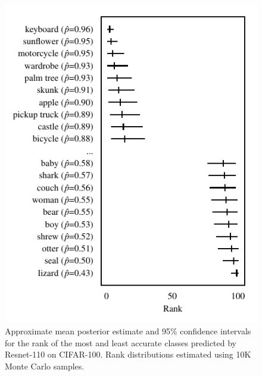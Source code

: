 \documentclass{article}
\begin{document}
\begin{figure}[t]
    \centering
    \includegraphics{figures/cifar100_rank.pdf}
    \caption{
        Approximate mean posterior estimate and 95\% confidence intervals for the rank of the most and least accurate classes predicted by Resnet-110 on CIFAR-100.
        Rank distributions estimated using 10K Monte Carlo samples.
    }
    \label{fig:cifar100_rank}
\end{figure}


\end{document}
